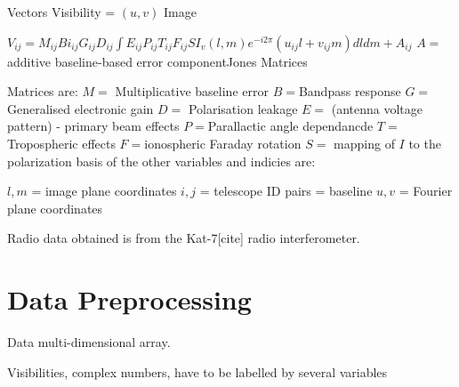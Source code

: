 Vectors
Visibility = $(u,v)$
Image


$V_{ij} = M_{ij} Bi_{ij} G_{ij} D_{ij} \int E_{ij} P_{ij} T_{ij} F_{ij} S I_v (l,m) e ^{-i2\pi} (u_{ij}l+v_{ij}m)dl dm +A_{ij}$
$A = $additive baseline-based error componentJones Matrices

Matrices are:
$M =$ Multiplicative baseline error
$B = $Bandpass response
$G =$ Generalised electronic gain
$D =$ Polarisation leakage
$E =$ (antenna voltage pattern) - primary beam effects
$P = $Parallactic angle dependancde
$T = $Tropospheric effects
$F = $ionospheric Faraday rotation
$S =$ mapping of $I$ to the polarization basis of the other variables and indicies are:

$l,m$ = image plane coordinates
$i,j$ = telescope ID pairs = baseline
$u,v$ = Fourier plane coordinates

Radio data obtained is from the Kat-7[cite] radio interferometer.

 
 
 
\section{Data Preprocessing}

Data multi-dimensional array.


Visibilities, complex numbers, have to be labelled by several variables 































